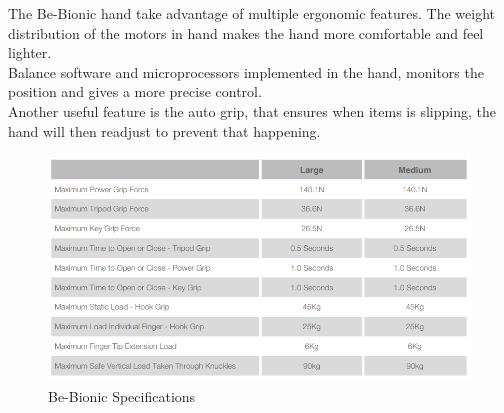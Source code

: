 The Be-Bionic hand take advantage of multiple ergonomic features. The weight distribution of the motors in hand makes the hand more comfortable and feel lighter.\\
Balance software and microprocessors implemented in the hand, monitors the position and gives a more precise control.\\
Another useful feature is the auto grip, that ensures when items is slipping, the hand will then readjust to prevent that happening.\\

\begin{figure}[H]
    \centering
    \includegraphics[width=15cm,height=6cm]{Sections/Contextual_Analysis/ProsthesesPics/specs-bebionic.png}
    \caption{Be-Bionic Specifications \cite{Be-bionic}}
    \label{fig:Be-BionicSpecs}
\end{figure}
